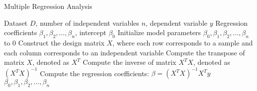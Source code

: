 \documentclass{article}
\begin{document}
	
	\begin{algorithm}
		\caption{Multiple Regression Analysis}
		\begin{algorithmic}[1]
			\Require Dataset $D$, number of independent variables $n$, dependent variable $y$
			\Ensure Regression coefficients $\beta_1, \beta_2, \ldots, \beta_n$, intercept $\beta_0$
			\State Initialize model parameters $\beta_0, \beta_1, \beta_2, \ldots, \beta_n$ to 0
			\State Construct the design matrix $X$, where each row corresponds to a sample and each column corresponds to an independent variable
			\State Compute the transpose of matrix $X$, denoted as $X^T$
			\State Compute the inverse of matrix $X^T X$, denoted as $(X^T X)^{-1}$
			\State Compute the regression coefficients: $\beta = (X^T X)^{-1} X^T y$
			\State \Return $\beta_0, \beta_1, \beta_2, \ldots, \beta_n$
		\end{algorithmic}
	\end{algorithm}
	
\end{document}
